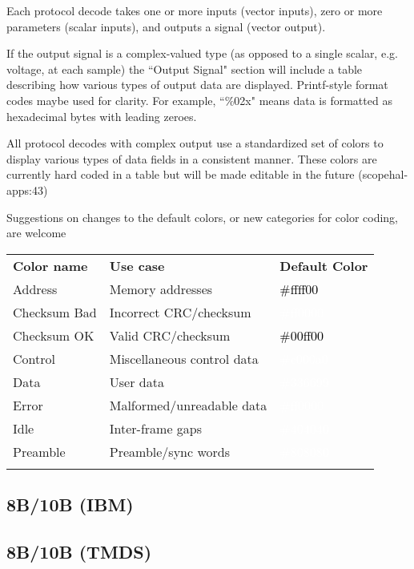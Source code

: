 Each protocol decode takes one or more inputs (vector inputs), zero or more parameters (scalar inputs), and outputs a
signal (vector output).

If the output signal is a complex-valued type (as opposed to a single scalar, e.g. voltage, at each sample) the
``Output Signal" section will include a table describing how various types of output data are displayed. Printf-style
format codes maybe used for clarity. For example, ``\%02x" means data is formatted as hexadecimal bytes with leading
zeroes.

All protocol decodes with complex output use a standardized set of colors to display various types of data fields in a
consistent manner. These colors are currently hard coded in a table but will be made editable in the future
(scopehal-apps:43)

Suggestions on changes to the default colors, or new categories for color coding, are welcome

\begin{tabularx}{16cm}{llX}
\thickhline
\textbf{Color name} & \textbf{Use case} & \textbf{Default Color} \\
\thickhline
Address & Memory addresses & \cellcolor{address}\textcolor{black}{\#ffff00} \\
\thickhline
Checksum Bad & Incorrect CRC/checksum & \cellcolor{checksumbad}\textcolor{white}{\#ff0000} \\
\thickhline
Checksum OK & Valid CRC/checksum & \cellcolor{checksumok}\textcolor{black}{\#00ff00} \\
\thickhline
Control & Miscellaneous control data & \cellcolor{control}\textcolor{white}{\#c000a0} \\
\thickhline
Data & User data & \cellcolor{data}\textcolor{white}{\#336699} \\
\thickhline
Error & Malformed/unreadable data & \cellcolor{error}\textcolor{white}{\#ff0000} \\
\thickhline
Idle & Inter-frame gaps & \cellcolor{idle}\textcolor{white}{\#404040} \\
\thickhline
Preamble & Preamble/sync words & \cellcolor{preamble}\textcolor{white}{\#808080} \\
\thickhline
\end{tabularx}

\subsection{8B/10B (IBM)}

\subsection{8B/10B (TMDS)}

